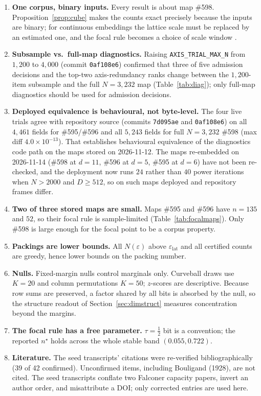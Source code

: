 \documentclass[11pt,a4paper]{article}
\theoremstyle{plain}
\theoremstyle{remark}
\begin{document}
\begin{enumerate}
\item \textbf{One corpus, binary inputs.} Every result is about map \#598. Proposition~\ref{prop:cube} makes the counts exact precisely because the inputs are binary; for continuous embeddings the lattice scale must be replaced by an estimated one, and the focal rule becomes a choice of scale window \citep{falconer2014fractal,camastra2016intrinsic}.
\item \textbf{Subsample vs.\ full-map diagnostics.} Raising \texttt{AXIS\_TRIAL\_MAX\_N} from $1{,}200$ to $4{,}000$ (commit \texttt{0af108e6}) confirmed that three of five admission decisions and the top-two axis-redundancy ranks change between the $1{,}200$-item subsample and the full $N=3{,}232$ map (Table~\ref{tab:diag}); only full-map diagnostics should be used for admission decisions.
\item \textbf{Deployed equivalence is behavioural, not byte-level.} The four live trials agree with repository source (commits \texttt{7d095ae} and \texttt{0af108e6}) on all $4{,}461$ fields for \#595/\#596 and all $5{,}243$ fields for full $N=3{,}232$ \#598 (max diff $4.0\times10^{-13}$). That establishes behavioural equivalence of the diagnostics code path on the maps stored on 2026-11-12. The maps re-embedded on 2026-11-14 (\#598 at $d=11$, \#596 at $d=5$, \#595 at $d=6$) have not been re-checked, and the deployment now runs $24$ rather than $40$ power iterations when $N>2000$ and $D\ge512$, so on such maps deployed and repository frames differ.
\item \textbf{Two of three stored maps are small.} Maps \#595 and \#596 have $n=135$ and $52$, so their focal rule is sample-limited (Table~\ref{tab:focalmaps}). Only \#598 is large enough for the focal point to be a corpus property.
\item \textbf{Packings are lower bounds.} All $N(\varepsilon)$ above $\varepsilon_{\mathrm{lat}}$ and all certified counts are greedy, hence lower bounds on the packing number.
\item \textbf{Nulls.} Fixed-margin nulls control marginals only. Curveball draws use $K=20$ and column permutations $K=50$; $z$-scores are descriptive. Because row sums are preserved, a factor shared by all bits is absorbed by the null, so the structure readout of Section~\ref{sec:dimstruct} measures concentration beyond the margins.
\item \textbf{The focal rule has a free parameter.} $\tau=\tfrac12$ bit is a convention; the reported $n^\star$ holds across the whole stable band $(0.055,0.722)$.
\item \textbf{Literature.} The seed transcripts' citations were re-verified bibliographically (39 of 42 confirmed). Unconfirmed items, including Bouligand (1928), are not cited. The seed transcripts conflate two Falconer capacity papers, invert an author order, and misattribute a DOI; only corrected entries are used here.
\end{enumerate}
\end{document}
